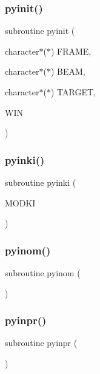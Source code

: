 \subsubsection{\texorpdfstring{pyinit()}{pyinit()}}
{\footnotesize\ttfamily subroutine pyinit (\begin{DoxyParamCaption}\item[{character$\ast$($\ast$)}]{F\+R\+A\+ME,  }\item[{character$\ast$($\ast$)}]{B\+E\+AM,  }\item[{character$\ast$($\ast$)}]{T\+A\+R\+G\+ET,  }\item[{}]{W\+IN }\end{DoxyParamCaption})}

\mbox{\label{pythia-6_84_824_8f_ae42caa9ba7af0a1b008fa608c8941e43}} 
\subsubsection{\texorpdfstring{pyinki()}{pyinki()}}
{\footnotesize\ttfamily subroutine pyinki (\begin{DoxyParamCaption}\item[{}]{M\+O\+D\+KI }\end{DoxyParamCaption})}

\mbox{\label{pythia-6_84_824_8f_aa7bdd8484862c65022c351660e12f59f}} 
\subsubsection{\texorpdfstring{pyinom()}{pyinom()}}
{\footnotesize\ttfamily subroutine pyinom (\begin{DoxyParamCaption}{ }\end{DoxyParamCaption})}

\mbox{\label{pythia-6_84_824_8f_a29c8fd890d3cef2da967153af66836ba}} 
\subsubsection{\texorpdfstring{pyinpr()}{pyinpr()}}
{\footnotesize\ttfamily subroutine pyinpr (\begin{DoxyParamCaption}{ }\end{DoxyParamCaption})}

